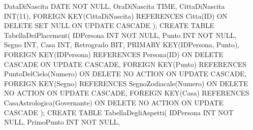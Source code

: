 \null\qquad DataDiNascita DATE NOT NULL,\newline
\null\qquad OraDiNascita TIME,\newline
\null\qquad CittaDiNascita INT(11),\newline
\null\qquad FOREIGN KEY(CittaDiNascita) REFERENCES Citta(ID)\newline
\null\qquad ON DELETE SET NULL\newline
\null\qquad ON UPDATE CASCADE\newline
);\newline\newline
CREATE TABLE TabellaDeiPlacement(\newline
\null\qquad IDPersona INT NOT NULL,\newline
\null\qquad Punto INT NOT NULL,\newline
\null\qquad Segno INT,\newline
\null\qquad Casa INT,\newline
\null\qquad Retrogrado BIT,\newline
\null\qquad PRIMARY KEY(IDPersona, Punto),\newline
\null\qquad FOREIGN KEY(IDPersona) REFERENCES Persona(ID)\newline
\null\qquad ON DELETE CASCADE\newline
\null\qquad ON UPDATE CASCADE,\newline
\null\qquad FOREIGN KEY(Punto) REFERENCES PuntoDelCielo(Numero)\newline
\null\qquad ON DELETE NO ACTION\newline
\null\qquad ON UPDATE CASCADE,\newline
\null\qquad FOREIGN KEY(Segno) REFERENCES SegnoZodiacale(Numero)\newline
\null\qquad ON DELETE NO ACTION\newline
\null\qquad ON UPDATE CASCADE,\newline
\null\qquad FOREIGN KEY(Casa) REFERENCES CasaAstrologica(Governante)\newline
\null\qquad ON DELETE NO ACTION\newline
\null\qquad ON UPDATE CASCADE\newline
);\newline\newline
CREATE TABLE TabellaDegliAspetti(\newline
\null\qquad IDPersona INT NOT NULL,\newline
\null\qquad PrimoPunto INT NOT NULL,\newline
